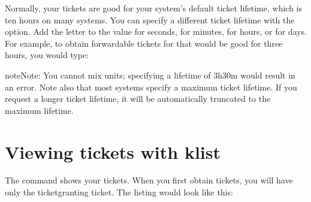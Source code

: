 \documentclass[letterpaper,10pt,english]{sphinxmanual}
\begin{document}
\sphinxAtStartPar
Normally, your tickets are good for your system’s default ticket
lifetime, which is ten hours on many systems.  You can specify a
different ticket lifetime with the  option.  Add the letter
 to the value for seconds,  for minutes,  for hours, or
 for days.  For example, to obtain forwardable tickets for
 that would be good for three hours, you would
type:

\begin{sphinxVerbatim}[commandchars=\\\{\}]
     
    \PYG{p}{[} \PYG{l+s+s1}{s password here.]}
\end{sphinxVerbatim}

\begin{sphinxadmonition}{note}{Note:}
\sphinxAtStartPar
You cannot mix units; specifying a lifetime of 3h30m would
result in an error.  Note also that most systems specify a
maximum ticket lifetime.  If you request a longer ticket
lifetime, it will be automatically truncated to the maximum
lifetime.
\end{sphinxadmonition}


\section{Viewing tickets with klist}
\label{\detokenize{user/tkt_mgmt:viewing-tickets-with-klist}}\label{\detokenize{user/tkt_mgmt:view-tkt}}
\sphinxAtStartPar
The {\hyperref[\detokenize{user/user_commands/klist:klist-1}]{}} command shows your tickets.  When you first obtain
tickets, you will have only the ticket\sphinxhyphen{}granting ticket.  The listing
would look like this:
\end{document}
